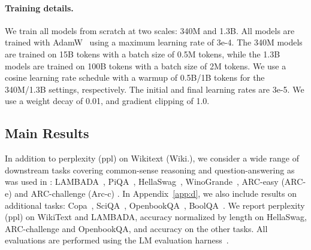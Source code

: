 \vspace{-2mm}
\paragraph{Training details.} We train all models from scratch at two scales: 340M and 1.3B.  All models are trained with AdamW~\citep{loshchilov2018fixing} using a maximum learning rate of 3e-4. The 340M models are trained on 15B tokens with a batch size of 0.5M tokens, while the 1.3B models are trained on 100B tokens with a batch size of 2M tokens. We use a cosine learning rate schedule with a warmup of 0.5B/1B tokens for the 340M/1.3B settings, respectively. The initial and final learning rates are 3e-5. We use a weight decay of 0.01, and gradient clipping of 1.0.

\vspace{-2mm}
\subsection{Main Results}
\vspace{-2mm}

In addition to perplexity (ppl) on Wikitext (Wiki.), we consider a wide range of downstream tasks covering common-sense reasoning and question-answering as was used in \citet{Gu2023MambaLS}: LAMBADA~\citep[LMB.; ][]{paperno2016lambada}, PiQA~\citep{bisk2020piqa}, HellaSwag~\citep[Hella.; ][]{zellers2019hellaswag}, WinoGrande~\citep[Wino.;][]{sakaguchi2021winogrande}, ARC-easy (ARC-e) and ARC-challenge (Arc-c) \citep{arc-ce}.
In Appendix~\ref{app:d}, we also include results on additional tasks: Copa~\citep{copa}, SciQA~\citep{SciQA2023}, OpenbookQA~\citep{openbookqa}, BoolQA~\citep{clark2019boolq}. We report perplexity (ppl) on WikiText and LAMBADA, accuracy normalized by length on
HellaSwag, ARC-challenge and OpenbookQA, and accuracy on the other tasks. All evaluations are performed using the LM evaluation harness~\citep{eval-harness}.

	
